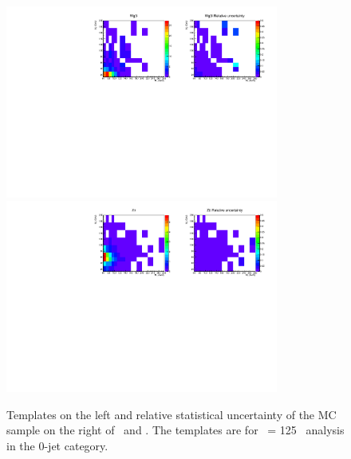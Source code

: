 \begin{figure}[htp]
\centering
\includegraphics[width=0.8\textwidth]{figures/2dtemplate_Wg3l_mH125_0j.pdf}
\includegraphics[width=0.8\textwidth]{figures/2dtemplate_Ztt_mH125_0j.pdf}
\caption{Templates on the left and relative statistical uncertainty of the MC sample
on the right of \wgammastar\ and \ztt. 
The templates are for \mHi\ = 125 \GeV\ analysis in the 0-jet category.}
\label{fig:2dtemplate_125_0j_4}
\end{figure}

